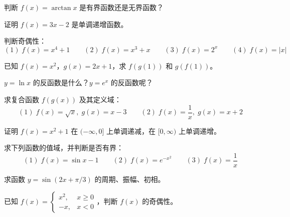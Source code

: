 \begin{exercise}[0]
判断 \(f(x) = \arctan x\) 是有界函数还是无界函数？
\end{exercise}


\begin{exercise}[1]
证明 \(f(x) = 3x - 2\) 是单调递增函数。
\end{exercise}

\begin{exercise}[1]
判断奇偶性：
\[
(1)\; f(x) = x^4 + 1 \qquad
(2)\; f(x) = x^3 + x \qquad
(3)\; f(x) = 2^x \qquad
(4)\; f(x) = |x|
\]
\end{exercise}

\begin{exercise}[1]
已知 \(f(x) = x^2\)，\(g(x) = 2x + 1\)，求 \(f(g(1))\) 和 \(g(f(1))\)。
\end{exercise}

\begin{exercise}[1]
\(y = \ln x\) 的反函数是什么？\(y = e^x\) 的反函数呢？
\end{exercise}


\begin{exercise}[2]
求复合函数 \(f(g(x))\) 及其定义域：
\[
(1)\; f(x) = \sqrt{x},\; g(x) = x - 3 \qquad
(2)\; f(x) = \frac{1}{x},\; g(x) = x + 2
\]
\end{exercise}

\begin{exercise}[2]
证明 \(f(x) = x^2 + 1\) 在 \((-\infty, 0]\) 上单调递减，在 \([0, \infty)\) 上单调递增。
\end{exercise}

\begin{exercise}[2]
求下列函数的值域，并判断是否有界：
\[
(1)\; f(x) = \sin x - 1 \qquad (2)\; f(x) = e^{-x^2} \qquad (3)\; f(x) = \frac{1}{x}
\]
\end{exercise}

\begin{exercise}[2]
求函数 \(y = \sin(2x + \pi/3)\) 的周期、振幅、初相。
\end{exercise}


\begin{exercise}[3]
已知 \(f(x) = 
\begin{cases}
x^2, & x \ge 0 \\
-x,  & x < 0
\end{cases}\)，判断 \(f(x)\) 的奇偶性。
\end{exercise}

